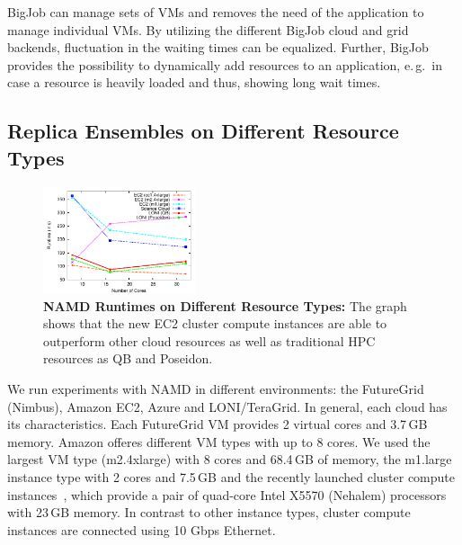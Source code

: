 \documentclass[conference,final]{IEEEtran}
\newcommand{\up}{\vspace*{-1em}}
\begin{document}
BigJob can manage sets of VMs and removes the
need of the application to manage individual VMs. By utilizing
the different BigJob cloud and grid backends, fluctuation in the waiting 
times can be equalized. Further, BigJob provides the possibility
to dynamically add resources to an application, e.\,g.\ in case a
resource is heavily loaded and thus, showing long wait times.



\subsection{Replica Ensembles on Different Resource Types}
\up
\label{sec:performance_namd}

\begin{figure}[t]
    \centering
        \includegraphics[width=0.4\textwidth]{performance/namd_run}
    \caption{\textbf{NAMD Runtimes on Different Resource Types: } The
          graph shows that the new EC2 cluster compute instances are 
          able to outperform other cloud resources as well as traditional
          HPC resources as QB and Poseidon.\up}
    \label{fig:performance_namd_run}
    \up
\end{figure}

We run experiments with NAMD in different environments: the FutureGrid (Nimbus),
Amazon EC2, Azure and LONI/TeraGrid. 
In general, each cloud has its characteristics. 
Each FutureGrid VM provides 2 virtual cores and 3.7\,GB memory. 
Amazon offeres different VM types with up to 8 cores. We used the largest 
VM type (m2.4xlarge) with 8 cores and 68.4\,GB of memory,
the m1.large instance type with 2 cores and 7.5\,GB  and the recently launched
cluster compute instances~\cite{ec2-cc}, which provide a pair of quad-core Intel 
X5570 (Nehalem) processors with 23\,GB memory. In contrast to other instance types,
cluster compute instances are connected using 10 Gbps Ethernet.
\end{document}
